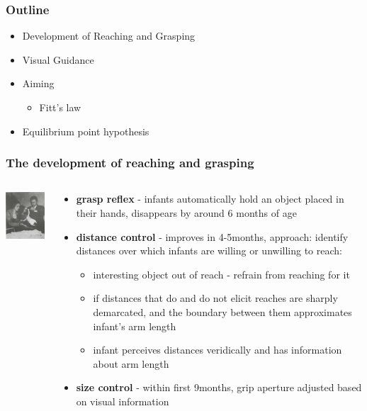 \documentclass[]{beamer}
\begin{document}
\begin{frame}
 \frametitle{Outline}
\begin{itemize}[<+->]
  \setlength{\itemsep}{5pt}
 \item Development of Reaching and Grasping
 \item Visual Guidance
 \item Aiming
 \begin{itemize}
 \item Fitt's law
 \end{itemize}
 \item Equilibrium point hypothesis
\end{itemize}
\end{frame}


\begin{frame}
 \frametitle{The development of reaching and grasping}
\begin{overlayarea}{110mm}{80mm}
\begin{columns}[T]
 \begin{column}{25mm}
\begin{center}
\includegraphics[width=30mm]{figs/l9/grasp_reflex.png}
\end{center}
 \end{column}
 \begin{column}{85mm}
  \begin{itemize}
   \item \textbf{grasp reflex} - infants automatically hold an object placed in their hands, disappears by around 6 months of age 
 \item<2-> \textbf{distance control} - improves in 4-5months, approach: identify distances over which infants are willing or unwilling to reach:  
 \begin{itemize}
 \item<3-> interesting object out of reach - refrain from reaching for it
 \item<3-> if distances that do and do not elicit reaches are sharply demarcated, and the boundary between them approximates infant's arm length
 \item<3->[$\rightarrow$] infant perceives distances veridically and has information about arm length
 \end{itemize}
\item<4-> \textbf{size control} - within first 9months, grip aperture adjusted based on visual information
  \end{itemize}
 \end{column}
\end{columns}
\end{overlayarea}
\end{frame}
\end{document}
